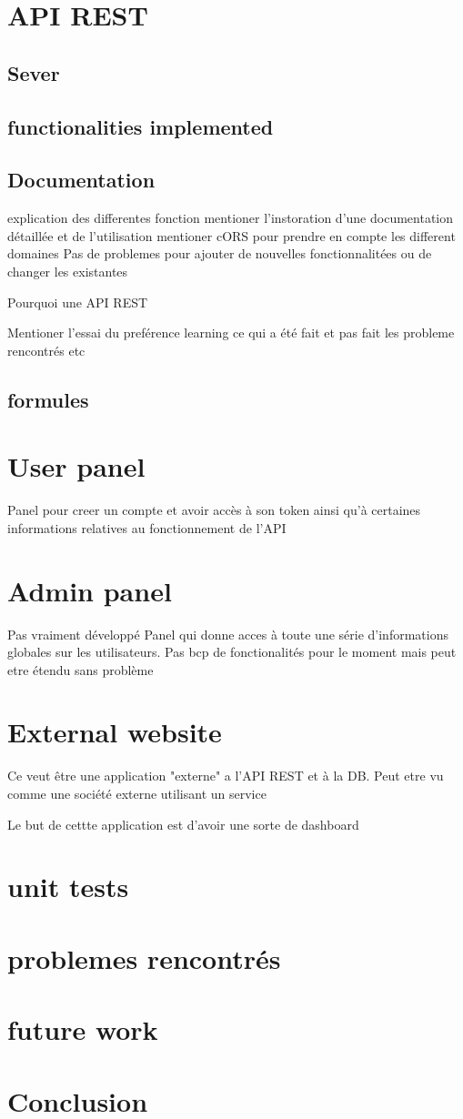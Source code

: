 \section{API REST}
\subsection{Sever}
\subsection{functionalities implemented}
\subsection{Documentation}
explication des differentes fonction
 mentioner l'instoration d'une documentation détaillée et de l'utilisation 
 mentioner cORS pour prendre en compte les different domaines
 Pas de problemes pour ajouter de nouvelles fonctionnalitées ou de changer les existantes
 
 Pourquoi une API REST
 
 Mentioner l'essai du preférence learning ce qui a été fait et pas fait les probleme rencontrés etc
 \subsection{formules}
 

\section{User panel}
Panel pour creer un compte et avoir accès à son token ainsi qu'à certaines informations relatives au fonctionnement de l'API

\section{Admin panel}
Pas vraiment développé
Panel qui donne acces à toute une série d'informations globales sur les utilisateurs. Pas bcp de fonctionalités pour le moment mais peut etre étendu sans problème

\section{External website}
Ce veut être une application "externe" a l'API REST et à la DB. Peut etre vu comme une société externe utilisant un service

Le but de cettte application est d'avoir une sorte de dashboard

\section{unit tests}

\section{problemes rencontrés}
\section{future work}
\section{Conclusion}
